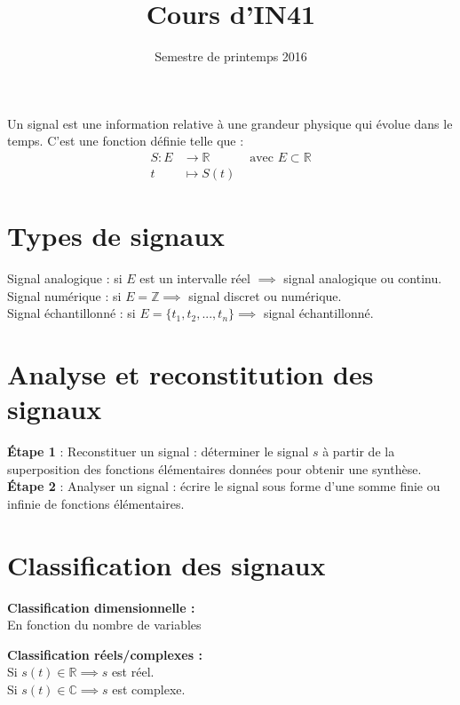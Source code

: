 \documentclass[a4paper,12pt]{article}
\title{Cours d'IN41}{Chapitre 1 -- Représentation et classification des signaux}
\author{}
\date{Semestre de printemps 2016}
\begin{document}
\maketitlepage

\tableofcontents
\pagebreak

\begin{defi}[Signal]
    Un signal est une information relative à une grandeur physique qui évolue dans le temps. C'est une fonction définie telle que :
    \begin{align*}
        S : E & \to \mathbb{R} & \text{ avec } E \subset \mathbb{R} \\
        t & \longmapsto S(t) &
    \end{align*}
\end{defi}

\neverindent

\section{Types de signaux}

Signal analogique : si $E$ est un intervalle réel $\implies$ signal analogique ou continu. \\
Signal numérique : si $E = \mathbb{Z} \implies$ signal discret ou numérique. \\
Signal échantillonné : si $E = \{t_{1}, t_{2}, ..., t_{n}\} \implies$ signal échantillonné.

\section{Analyse et reconstitution des signaux}

\textbf{\'Etape 1} : Reconstituer un signal : déterminer le signal $s$ à partir de la superposition des fonctions élémentaires données pour obtenir une synthèse. \\
\textbf{\'Etape 2} : Analyser un signal : écrire le signal sous forme d'une somme finie ou infinie de fonctions élémentaires.

\section{Classification des signaux}

\textbf{Classification dimensionnelle :} \\
En fonction du nombre de variables

\textbf{Classification réels/complexes :} \\
Si $s(t) \in \mathbb{R} \implies s$ est réel. \\
Si $s(t) \in \mathbb{C} \implies s$ est complexe.
\end{document}
